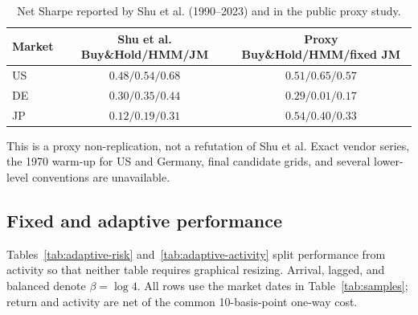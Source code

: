 \documentclass[11pt]{article}
\newcommand{\BH}{Buy\&Hold}
\begin{document}
\begin{table}[!htbp]
\centering
\caption{Net Sharpe reported by Shu et al. (1990--2023) and in the public proxy
study.}
\label{tab:paper-proxy}
\begin{tabular}{lcc}
\toprule
Market & Shu et al. \BH{}/HMM/JM & Proxy \BH{}/HMM/fixed JM \\
\midrule
US & \(0.48/0.54/0.68\) & \(0.51/0.65/0.57\) \\
DE & \(0.30/0.35/0.44\) & \(0.29/0.01/0.17\) \\
JP & \(0.12/0.19/0.31\) & \(0.54/0.40/0.33\) \\
\bottomrule
\end{tabular}
\end{table}

This is a proxy non-replication, not a refutation of Shu et al. Exact vendor
series, the 1970 warm-up for US and Germany, final candidate grids, and several
lower-level conventions are unavailable.

\subsection{Fixed and adaptive performance}

Tables~\ref{tab:adaptive-risk} and~\ref{tab:adaptive-activity} split performance
from activity so that neither table requires graphical resizing. Arrival,
lagged, and balanced denote \(\beta=\log4\). All rows use the market dates in
Table~\ref{tab:samples}; return and activity are net of the common 10-basis-point
one-way cost.
\end{document}
